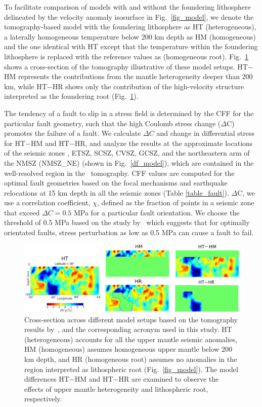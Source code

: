 \documentclass[draft,linenumbers]{agujournal2018}
\begin{document}
To facilitate comparison of models with and without the foundering lithosphere delineated by the velocity anomaly isosurface in Fig.~\ref{fig_model}, we denote the tomography-based model with the foundering lithosphere as HT (heterogeneous), a laterally homogeneous temperature below 200 km depth as HM (homogeneous) and the one identical with HT except that the temperature within the foundering lithosphere is replaced with the reference values as (homogeneous root). Fig.~\ref{model_differences} shows a cross-section of the tomography illustrative of these model setups. HT$-$HM represents the contributions from the mantle heterogeneity deeper than 200 km, while HT$-$HR shows only the contribution of the high-velocity structure interpreted as the foundering root (Fig.~\ref{model_differences}).  

The tendency of a fault to slip in a stress field is determined by the CFF for the particular fault geometry, such that the high Coulomb stress change ($\Delta$C) promotes the failure of a fault. We calculate $\Delta C$ and change in differential stress for HT$-$HM and HT$-$HR, and analyze the results at the approximate locations of the seismic zones , ETSZ, SCSZ, CVSZ, GCSZ, and the northeastern arm of the NMSZ (NMSZ\_NE) (shown in Fig.~\ref{df_model}), which are contained in the well-resolved region in the~\citet{Biryol_2016} tomography. CFF values are computed for the optimal fault geometries based on the focal mechanisms and earthquake relocations at 15 km depth in all the seismic zones (Table \ref{table_fault}).  $\Delta$C, we use a correlation coefficient, $\chi$, defined as the fraction of points in a seismic zone that exceed $\Delta C = 0.5$ MPa for a particular fault orientation. We choose the threshold of 0.5 MPa based on the study by~\citet{stein1999role} which suggests that for optimally orientated faults, stress perturbation as low as 0.5 MPa can cause a fault to fail.
%
\begin{figure}[h!]
    \centering
    \includegraphics[width=\linewidth]{figures/model_differences.png}
    \caption{Cross-section across different model setups based on the tomography results by~\citep{Biryol_2016}, and the corresponding acronym used in this study. HT (heterogeneous) accounts for all the upper mantle seismic anomalies, HM (homogeneous) assumes homogeneous upper mantle below 200 km depth, and HR (homogeneous root) assumes no anomalies in the region interpreted as lithospheric root (Fig.~\ref{fig_model}). The model differences HT$-$HM and HT$-$HR are examined to observe the effects of upper mantle heterogeneity and lithospheric root, respectively.}
    \label{model_differences}
\end{figure}
\end{document}

